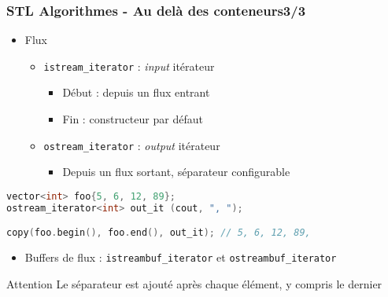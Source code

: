\documentclass[C++.tex]{subfiles}
\begin{document}
\begin{frame}[fragile]
	\frametitle{STL Algorithmes - Au delà des conteneurs\titlehfill{}3/3}
	\begin{itemize}
		\item Flux
		\begin{itemize}
			\item \lstinline|istream_iterator| : \textit{input} itérateur
			\begin{itemize}
				\item Début : depuis un flux entrant
				\item Fin : constructeur par défaut
			\end{itemize}
			\item \lstinline|ostream_iterator| : \textit{output} itérateur
			\begin{itemize}
				\item Depuis un flux sortant, séparateur configurable
			\end{itemize}
		\end{itemize}
	\end{itemize}

	\begin{lstlisting}[language=C++]
vector<int> foo{5, 6, 12, 89};
ostream_iterator<int> out_it (cout, ", ");

copy(foo.begin(), foo.end(), out_it); // 5, 6, 12, 89,\end{lstlisting}

	\begin{itemize}
		\item Buffers de flux : \lstinline|istreambuf_iterator| et \lstinline|ostreambuf_iterator|
	\end{itemize}

	\begin{alertblock}{Attention}
		Le séparateur est ajouté après chaque élément, y compris le dernier
	\end{alertblock}
\end{frame}
\end{document}
